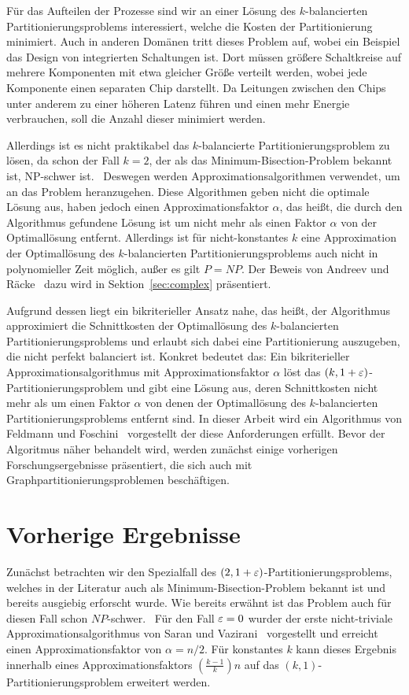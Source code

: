 Für das Aufteilen der Prozesse sind wir an einer Lösung des $k$\hyp balancierten Partitionierungsproblems interessiert, welche die Kosten der Partitionierung minimiert.
Auch in anderen Domänen tritt dieses Problem auf, wobei ein Beispiel das Design von integrierten Schaltungen ist.
Dort müssen größere Schaltkreise auf mehrere Komponenten mit etwa gleicher Größe verteilt werden, wobei jede Komponente einen separaten Chip darstellt.
Da Leitungen zwischen den Chips unter anderem zu einer höheren Latenz führen und einen mehr Energie verbrauchen, soll die Anzahl dieser minimiert werden.

Allerdings ist es nicht praktikabel das $k$\hyp balancierte Partitionierungsproblem zu lösen, da schon der Fall $k=2$, der als das Minimum-Bisection-Problem bekannt ist, NP-schwer ist.~\cite{gj79}
Deswegen werden Approximationsalgorithmen verwendet, um an das Problem heranzugehen.
Diese Algorithmen geben nicht die optimale Lösung aus, haben jedoch einen Approximationsfaktor $\alpha$, das heißt, die durch den Algorithmus gefundene Lösung ist um nicht mehr als einen Faktor $\alpha$ von der Optimallösung entfernt.
Allerdings ist für nicht-konstantes $k$ eine Approximation der Optimallösung des $k$\hyp balancierten Partitionierungsproblems auch nicht in polynomieller Zeit möglich, außer es gilt $P=NP$.
Der Beweis von Andreev und Räcke~\cite{ar06} dazu wird in Sektion~\ref{sec:complex} präsentiert.

Aufgrund dessen liegt ein bikriterieller Ansatz nahe, das heißt, der Algorithmus approximiert die Schnittkosten der Optimallösung des $k$\hyp balancierten Partitionierungsproblems und erlaubt sich dabei eine Partitionierung auszugeben, die nicht perfekt balanciert ist.
Konkret bedeutet das: Ein bikriterieller Approximationsalgorithmus mit Approximationsfaktor $\alpha$ löst das $(k, 1 + \varepsilon)$\hyp Partitionierungsproblem und gibt eine Lösung aus, deren Schnittkosten nicht mehr als um einen Faktor $\alpha$ von denen der Optimallösung des $k$\hyp balancierten Partitionierungsproblems entfernt sind.
In dieser Arbeit wird ein Algorithmus von Feldmann und Foschini~\cite{ff13} vorgestellt der diese Anforderungen erfüllt.
Bevor der Algoritmus näher behandelt wird, werden zunächst einige vorherigen Forschungsergebnisse präsentiert, die sich auch mit Graphpartitionierungsproblemen beschäftigen.

\section{Vorherige Ergebnisse}
Zunächst betrachten wir den Spezialfall des $(2, 1 + \varepsilon)$\hyp Partitionierungsproblems, welches in der Literatur auch als Minimum-Bisection-Problem bekannt ist und bereits ausgiebig erforscht wurde.
Wie bereits erwähnt ist das Problem auch für diesen Fall schon $NP$\hyp schwer.~\cite{gj79}
Für den Fall $\varepsilon = 0$ wurder der erste nicht-triviale Approximationsalgorithmus von Saran und Vazirani~\cite{SV91} vorgestellt und erreicht einen Approximationsfaktor von $\alpha = n/2$.
Für konstantes $k$ kann dieses Ergebnis innerhalb eines Approximationsfaktors $\left(\frac{k-1}{k}\right)n$ auf das $(k, 1)$\hyp Partitionierungsproblem erweitert werden.

